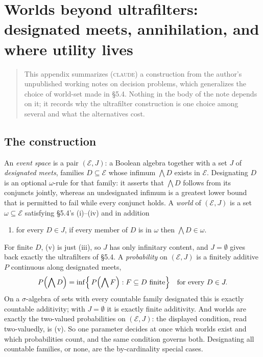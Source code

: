 \documentclass[11pt,a4paper]{article}
\newcommand{\cE}{\mathcal{E}}
\newcommand{\CLAUDE}{\textnormal{\scshape claude}}
\begin{document}
\section{Worlds beyond ultrafilters: designated meets, annihilation, and where utility lives}

\begin{quote}\small
This appendix summarizes (\CLAUDE) a construction from the author's unpublished working notes on decision problems, which generalizes the choice of world-set made in \S5.4. Nothing in the body of the note depends on it; it records why the ultrafilter construction is one choice among several and what the alternatives cost.
\end{quote}

\subsection{The construction}
An \emph{event space} is a pair $(\cE, J)$: a Boolean algebra together with a set $J$ of \emph{designated meets}, families $D \subseteq \cE$ whose infimum $\bigwedge D$ exists in $\cE$. Designating $D$ is an optional $\omega$-rule for that family: it asserts that $\bigwedge D$ follows from its conjuncts jointly, whereas an undesignated infimum is a greatest lower bound that is permitted to fail while every conjunct holds. A \emph{world} of $(\cE, J)$ is a set $\omega \subseteq \cE$ satisfying \S5.4's (i)--(iv) and in addition
\begin{enumerate}[label=(\roman*),leftmargin=2.5em,start=5]
\item for every $D \in J$, if every member of $D$ is in $\omega$ then $\bigwedge D \in \omega$.
\end{enumerate}
For finite $D$, (v) is just (iii), so $J$ has only infinitary content, and $J = \emptyset$ gives back exactly the ultrafilters of \S5.4. A \emph{probability} on $(\cE, J)$ is a finitely additive $P$ continuous along designated meets,
\[
P\Bigl(\bigwedge D\Bigr) = \inf\Bigl\{\,P\Bigl(\bigwedge F\Bigr) : F \subseteq D \text{ finite}\Bigr\} \quad\text{for every } D \in J.
\]
On a $\sigma$-algebra of sets with every countable family designated this is exactly countable additivity; with $J = \emptyset$ it is exactly finite additivity. And worlds are exactly the two-valued probabilities on $(\cE, J)$: the displayed condition, read two-valuedly, is (v). So one parameter decides at once which worlds exist and which probabilities count, and the same condition governs both. Designating all countable families, or none, are the by-cardinality special cases.
\end{document}
